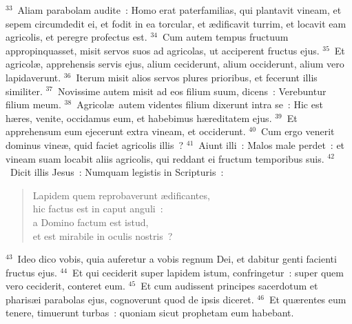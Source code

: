 ${}^{33}$~Aliam parabolam audite~: Homo erat paterfamilias, qui plantavit vineam, et sepem circumdedit ei, et fodit in ea torcular, et \ae dificavit turrim, et locavit eam agricolis, et peregre profectus est.
${}^{34}$~Cum autem tempus fructuum appropinquasset, misit servos suos ad agricolas, ut acciperent fructus ejus.
${}^{35}$~Et agricol\ae , apprehensis servis ejus, alium ceciderunt, alium occiderunt, alium vero lapidaverunt.
${}^{36}$~Iterum misit alios servos plures prioribus, et fecerunt illis similiter.
${}^{37}$~Novissime autem misit ad eos filium suum, dicens~: Verebuntur filium meum.
${}^{38}$~Agricol\ae\ autem videntes filium dixerunt intra se~: Hic est h\ae res, venite, occidamus eum, et habebimus h\ae reditatem ejus.
${}^{39}$~Et apprehensum eum ejecerunt extra vineam, et occiderunt.
${}^{40}$~Cum ergo venerit dominus vine\ae , quid faciet agricolis illis~?
${}^{41}$~Aiunt illi~: Malos male perdet~: et vineam suam locabit aliis agricolis, qui reddant ei fructum temporibus suis.
${}^{42}$~Dicit illis Jesus~: Numquam legistis in Scripturis~: \begin{verse}Lapidem quem reprobaverunt \ae dificantes,\\ hic factus est in caput anguli~:\\ a Domino factum est istud,\\ et est mirabile in oculis nostris~?\end{verse}


${}^{43}$~Ideo dico vobis, quia auferetur a vobis regnum Dei, et dabitur genti facienti fructus ejus.
${}^{44}$~Et qui ceciderit super lapidem istum, confringetur~: super quem vero ceciderit, conteret eum.
${}^{45}$~Et cum audissent principes sacerdotum et pharis\ae i parabolas ejus, cognoverunt quod de ipsis diceret.
${}^{46}$~Et qu\ae rentes eum tenere, timuerunt turbas~: quoniam sicut prophetam eum habebant.

